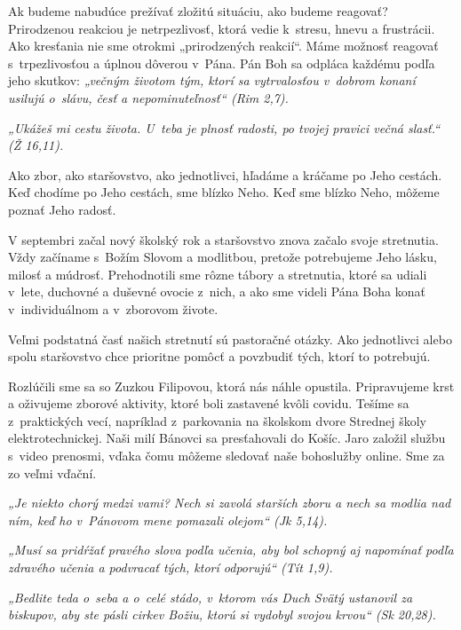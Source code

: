 Ak budeme nabudúce prežívať zložitú situáciu, ako budeme reagovať? Prirodzenou reakciou je netrpezlivosť, ktorá vedie k~stresu, hnevu a frustrácii. Ako kresťania nie sme otrokmi „prirodzených reakcií“. Máme možnosť reagovať s~trpezlivosťou a úplnou dôverou v~Pána. Pán Boh sa odpláca každému podľa jeho skutkov: {\it „večným životom tým, ktorí sa vytrvalosťou v~dobrom konaní usilujú o~slávu, česť a nepominuteľnosť“ (Rim 2,7).}



{\it „Ukážeš mi cestu života. U~teba je plnosť radosti, po tvojej pravici večná slasť.“ (Ž 16,11).}

Ako zbor, ako staršovstvo, ako jednotlivci, hľadáme a kráčame po Jeho cestách. Keď chodíme po Jeho cestách, sme blízko Neho. Keď sme blízko Neho, môžeme poznať Jeho radosť.

V septembri začal nový školský rok a staršovstvo znova začalo svoje stretnutia. Vždy začíname s~Božím Slovom a modlitbou, pretože potrebujeme Jeho lásku, milosť a múdrosť. Prehodnotili sme rôzne tábory a stretnutia, ktoré sa udiali v~lete, duchovné a duševné ovocie z~nich, a ako sme videli Pána Boha konať v~individuálnom a v~zborovom živote.

Veľmi podstatná časť našich stretnutí sú pastoračné otázky. Ako jednotlivci alebo spolu staršovstvo chce prioritne pomôcť a povzbudiť tých, ktorí to potrebujú.

Rozlúčili sme sa so Zuzkou Filipovou, ktorá nás náhle opustila. Pripravujeme krst a oživujeme zborové aktivity, ktoré boli zastavené kvôli covidu. Tešíme sa z~praktických vecí, napríklad z~parkovania na školskom dvore Strednej školy elektrotechnickej. Naši milí Bánovci sa presťahovali do Košíc. Jaro založil službu s~video prenosmi, vďaka čomu môžeme sledovať naše bohoslužby online. Sme za zo veľmi vďační.

{\it„Je niekto chorý medzi vami? Nech si zavolá starších zboru a nech sa modlia nad ním, keď ho v~Pánovom mene pomazali olejom“ (Jk 5,14).}

{\it „Musí sa pridŕžať pravého slova podľa učenia, aby bol schopný aj napomínať podľa zdravého učenia a podvracať tých, ktorí odporujú“ (Tít 1,9).}

{\it „Bedlite teda o~seba a o~celé stádo, v~ktorom vás Duch Svätý ustanovil za biskupov, aby ste pásli cirkev Božiu, ktorú si vydobyl svojou krvou“ (Sk 20,28).}

\vfill\break


